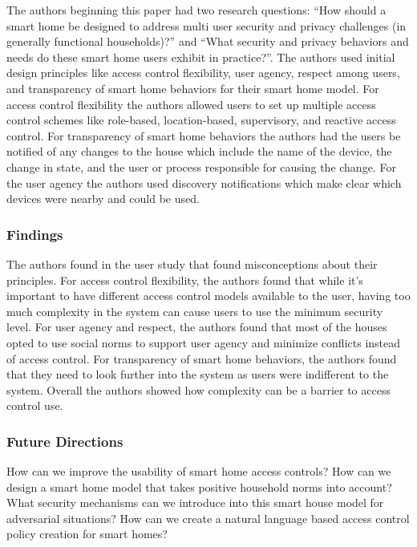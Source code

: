 \noindent
The authors beginning this paper had two research questions: “How should a smart home be designed to address multi user security and privacy challenges (in generally functional households)?” and “What security and privacy behaviors and needs do these smart home users exhibit in practice?”. The authors used initial design principles like access control flexibility, user agency, respect among users, and transparency of smart home behaviors for their smart home model. For access control flexibility the authors allowed users to set up multiple access control schemes like role-based, location-based, supervisory, and reactive access control. For transparency of smart home behaviors the authors had the users be notified of any changes to the house which include the name of the device, the change in state, and the user or process responsible for causing the change. For the user agency the authors used discovery notifications which make clear which devices were nearby and could be used.

\subsubsection{Findings}

\noindent
The authors found in the user study that found misconceptions about their principles. For access control flexibility, the authors found that while it’s important to have different access control models available to the user, having too much complexity in the system can cause users to use the minimum security level. For user agency and respect, the authors found that most of the houses opted to use social norms to support user agency and minimize conflicts instead of access control. For transparency of smart home behaviors, the authors found that they need to look further into the system as users were indifferent to the system. Overall the authors showed how complexity can be a barrier to access control use.

\subsubsection{Future Directions}

\noindent
How can we improve the usability of smart home access controls? How can we design a smart home model that takes positive household norms into account? What security mechanisms can we introduce into this smart house model for adversarial situations? How can we create a natural language based access control policy creation for smart homes?

